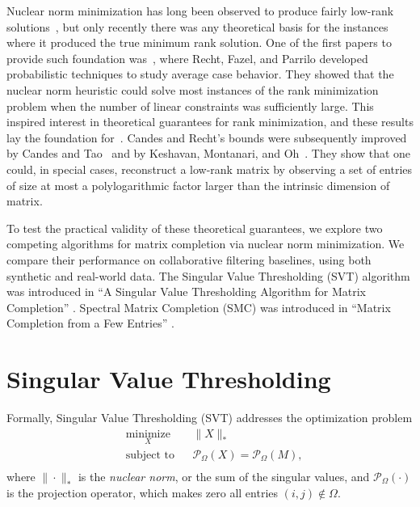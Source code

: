 \documentclass{article} %
\begin{document}
Nuclear norm minimization has long been observed to produce fairly
low-rank solutions~\cite{r11, r12, r26}, but only recently there was
any theoretical basis for the instances where it produced the true
minimum rank solution. One of the first papers to provide such
foundation was~\cite{r24}, where Recht, Fazel, and Parrilo developed
probabilistic techniques to study average case behavior. They showed
that the nuclear norm heuristic could solve most instances of the rank
minimization problem when the number of linear constraints was
sufficiently large. This inspired interest in theoretical guarantees
for rank minimization, and these results lay the foundation
for~\cite{r4}. Candes and Recht’s bounds were subsequently improved by
Candes and Tao~\cite{r7} and by Keshavan, Montanari, and
Oh~\cite{keshavan2010matrix}. They show that one could, in special
cases, reconstruct a low-rank matrix by observing a set of entries of
size at most a polylogarithmic factor larger than the intrinsic
dimension of matrix.

To test the practical validity of these theoretical guarantees, we
explore two competing algorithms for matrix completion via nuclear
norm minimization. We compare their performance on collaborative
filtering baselines, using both synthetic and real-world data. The
Singular Value Thresholding (SVT) algorithm was introduced in ``A
Singular Value Thresholding Algorithm for Matrix Completion''
\cite{cai2010singular}. Spectral Matrix Completion (SMC) was
introduced in ``Matrix Completion from a Few Entries''
\cite{keshavan2010matrix}.

\section{Singular Value Thresholding}

Formally, Singular Value Thresholding (SVT) addresses the optimization
problem
\begin{equation*}
\begin{aligned}
  & \underset{X}{\text{minimize}} & & \|X\|_{*} \\
  & \text{subject to}             & & \mathcal{P}_\Omega (X) =
  \mathcal{P}_\Omega (M), \\
\end{aligned}
\end{equation*}
where $\|\cdot\|_{*}$ is the \emph{nuclear norm}, or the sum of the
singular values, and $\mathcal{P}_\Omega (\cdot)$ is the projection
operator, which makes zero all entries $(i, j) \notin \Omega$.
\end{document}
